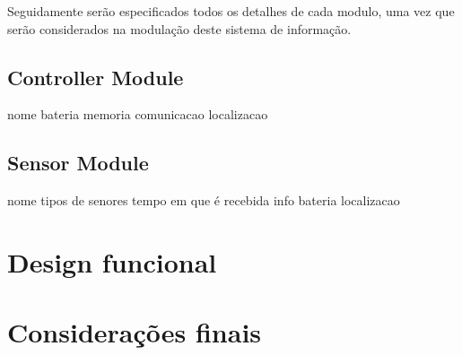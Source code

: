 Seguidamente serão especificados todos os detalhes de cada modulo, uma vez que serão considerados na modulação deste sistema de informação. 

\subsection{Controller Module}

nome
bateria
memoria
comunicacao
localizacao


\subsection{Sensor Module}


nome
tipos de senores 
tempo em que é recebida info 
bateria
localizacao



\newpage

\section{Design funcional}













\section{Considerações finais}